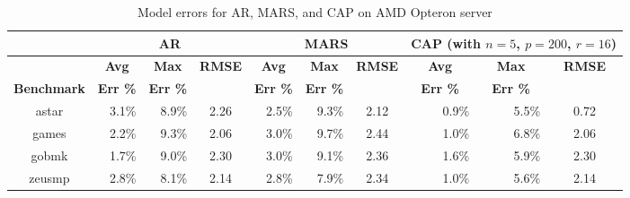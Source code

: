 \documentclass[times,10pt,finalversion]{usetex-v1}
\begin{document}
\begin{small}
{\setlength{\abovedisplayskip}{0pt plus 0pt minus 0pt}
 \setlength{\belowdisplayskip}{0pt plus 0pt minus 0pt}
\begin{table}[tbp]
  \centering
    \caption{Model errors for AR, MARS, and CAP on AMD Opteron server}
    \label{tab:modelerroropt}
    \begin{tabular}[phtb]{c |r r c|r r c|r r c}
      \hline
      \multicolumn{1}{c|}{}&\multicolumn{3}{c|}{\small{\textbf{AR}}}&\multicolumn{3}{c|}{\small{\textbf{MARS}}}&\multicolumn{3}{c}{\small{\textbf{CAP}
          (with $n=5$,
            $p=200$, $r=16$)}}\\
        \hline
  &\multicolumn{1}{c}{\small{\textbf{Avg}}}&\multicolumn{1}{c}{\small{\textbf{Max}}}&\multicolumn{1}{c|}{\small{\textbf{RMSE}}}&\multicolumn{1}{c}{\small{\textbf{Avg}}}&\multicolumn{1}{c}{\small{\textbf{Max}}}&\multicolumn{1}{c|}{\small{\textbf{RMSE}}}&\multicolumn{1}{c}{\small{\textbf{Avg}}}&\multicolumn{1}{c}{\small{\textbf{Max}}}&\multicolumn{1}{c}{\small{\textbf{RMSE}}}\\
\multicolumn{1}{c|}{\small{\textbf{Benchmark}}}&\multicolumn{1}{c}{\small{\textbf{Err \%}}}&\multicolumn{1}{c}{\small{\textbf{Err \%}}}&\multicolumn{1}{c|}{}&\multicolumn{1}{c}{\small{\textbf{Err \%}}}&\multicolumn{1}{c}{\small{\textbf{Err \%}}}&\multicolumn{1}{c|}{\small{\textbf{}}}&\multicolumn{1}{c}{\small{\textbf{Err \%}}}&\multicolumn{1}{c}{\small{\textbf{Err \%}}}&\multicolumn{1}{c}{}\\
      \hline      
      \small{astar }&\small{3.1\%}&\small{8.9\%}&\small{2.26}&\small{2.5\%}&\small{9.3\%}&\small{2.12}&\small{0.9\%}&\small{5.5\%}&\small{0.72}\\
      \small{games }&\small{2.2\%}&\small{9.3\%}&\small{2.06}&\small{3.0\%}&\small{9.7\%}&\small{2.44}&\small{1.0\%}&\small{6.8\%}&\small{2.06}\\
      \small{gobmk }&\small{1.7\%}&\small{9.0\%}&\small{2.30}&\small{3.0\%}&\small{9.1\%}&\small{2.36}&\small{1.6\%}&\small{5.9\%}&\small{2.30}\\
      \small{zeusmp}&\small{2.8\%}&\small{8.1\%}&\small{2.14}&\small{2.8\%}&\small{7.9\%}&\small{2.34}&\small{1.0\%}&\small{5.6\%}&\small{2.14}\\
      \hline
    \end{tabular}
  \end{table}
}
\end{small}
\end{document}
